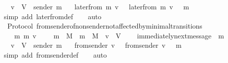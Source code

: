 \begin{isabellebody}
\ \ {\isasymlongrightarrow}\ v\ {\isasymin}\ V\ {\isacharminus}\ {\isacharbraceleft}sender\ m{\isacharprime}{\isacharbraceright}\isanewline
\ \ {\isasymlongrightarrow}\ later{\isacharunderscore}from\ {\isacharparenleft}m{\isacharcomma}\ v{\isacharcomma}\ {\isasymsigma}{\isacharparenright}\ {\isacharequal}\ later{\isacharunderscore}from\ {\isacharparenleft}m{\isacharcomma}\ v{\isacharcomma}\ {\isasymsigma}\ {\isasymunion}\ {\isacharbraceleft}m{\isacharprime}{\isacharbraceright}{\isacharparenright}{\isachardoublequoteclose}\isanewline
%
\isadelimproof
\ \ %
\endisadelimproof
%
\isatagproof
{}\isamarkupfalse%
\ {\isacharparenleft}simp\ add{\isacharcolon}\ later{\isacharunderscore}from{\isacharunderscore}def{\isacharparenright}\isanewline
\ \ \isamarkupfalse%
\ auto%
\endisatagproof
{\isafoldproof}%
%
\isadelimproof
\ \isanewline
%
\endisadelimproof
\isanewline
{}\isamarkupfalse%
\ {\isacharparenleft}\ Protocol{\isacharparenright}\ from{\isacharunderscore}sender{\isacharunderscore}of{\isacharunderscore}non{\isacharunderscore}sender{\isacharunderscore}not{\isacharunderscore}affected{\isacharunderscore}by{\isacharunderscore}minimal{\isacharunderscore}transitions\ {\isacharcolon}\isanewline
\ \ {\isachardoublequoteopen}{\isasymforall}\ {\isasymsigma}\ m\ m{\isacharprime}\ v{\isachardot}\ {\isasymsigma}\ {\isasymin}\ {\isasymSigma}\ {\isasymand}\ m\ {\isasymin}\ M\ {\isasymand}\ m{\isacharprime}\ {\isasymin}\ M\ {\isasymand}\ v\ {\isasymin}\ V\ \isanewline
\ \ {\isasymlongrightarrow}\ immediately{\isacharunderscore}next{\isacharunderscore}message\ {\isacharparenleft}{\isasymsigma}{\isacharcomma}\ m{\isacharprime}{\isacharparenright}\isanewline
\ \ {\isasymlongrightarrow}\ v\ {\isasymin}\ V\ {\isacharminus}\ {\isacharbraceleft}sender\ m{\isacharprime}{\isacharbraceright}\isanewline
\ \ {\isasymlongrightarrow}\ from{\isacharunderscore}sender\ {\isacharparenleft}v{\isacharcomma}\ {\isasymsigma}{\isacharparenright}\ {\isacharequal}\ from{\isacharunderscore}sender\ {\isacharparenleft}v{\isacharcomma}\ {\isasymsigma}\ {\isasymunion}\ {\isacharbraceleft}m{\isacharprime}{\isacharbraceright}{\isacharparenright}{\isachardoublequoteclose}\isanewline
%
\isadelimproof
\ \ %
\endisadelimproof
%
\isatagproof
{}\isamarkupfalse%
\ {\isacharparenleft}simp\ add{\isacharcolon}\ from{\isacharunderscore}sender{\isacharunderscore}def{\isacharparenright}\isanewline
\ \ \isamarkupfalse%
\ auto%
\endisatagproof
{\isafoldproof}%
%
\isadelimproof
\ \isanewline
%
\endisadelimproof
\isanewline
\isanewline

\end{isabellebody}
